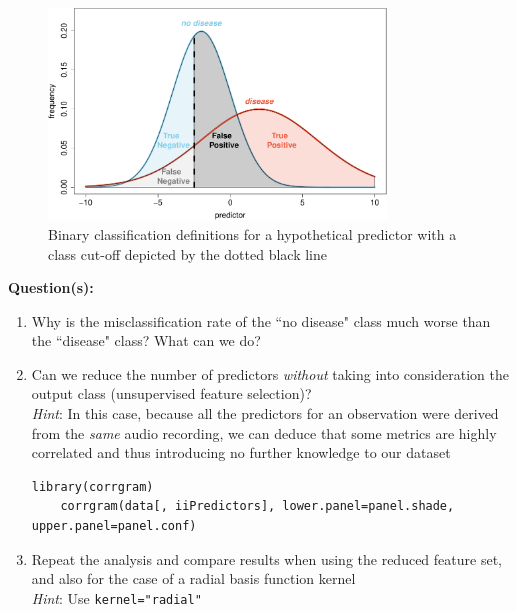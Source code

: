 \documentclass[a4paper,11pt]{article}
\begin{document}
\begin{figure}[htbp]
	\centering
	\includegraphics[width=0.8\textwidth]{DefinitionsPlot.pdf}
	\caption{Binary classification definitions for a hypothetical predictor with a class cut-off depicted by the dotted black line}
	\label{fig:DefinitionsPlot}
\end{figure}

\begin{framed}
\textbf{Question(s):}
\begin{enumerate}
	\item Why is the misclassification rate of the ``no disease" class much worse than the ``disease" class? What can we do?
	\item Can we reduce the number of predictors \textit{without} taking into consideration the output class (unsupervised feature selection)? 
	\\
	\textit{Hint}: In this case, because all the predictors for an observation were derived from the \textit{same} audio recording, 
	we can deduce that some metrics are highly correlated and thus introducing no further knowledge to our dataset
	\\
	\begin{lstlisting}[style=RCode, backgroundcolor=\color{white}]
	library(corrgram)
	corrgram(data[, iiPredictors], lower.panel=panel.shade, upper.panel=panel.conf)
	\end{lstlisting}
	\vspace{-0.6cm} %
	\item Repeat the analysis and compare results when using the reduced feature set, and also for the case of a radial basis function kernel 
	\\
	\textit{Hint}: Use {\lstinline[style=RCode, basicstyle=\normalsize\ttfamily] |kernel="radial"|}
	\vspace{-0.5cm} %
\end{enumerate}
\end{framed}

\end{document}
